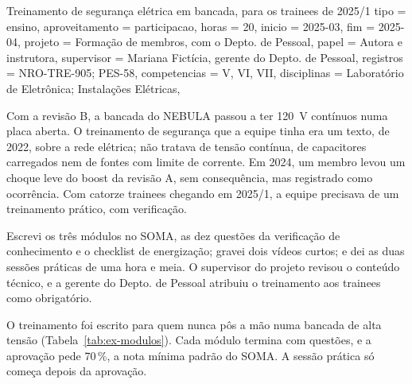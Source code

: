 \begin{atividade}{Treinamento de segurança elétrica em bancada, para os trainees de 2025/1}{
  tipo         = ensino,
  aproveitamento = participacao,
  horas        = 20,
  inicio       = 2025-03,
  fim          = 2025-04,
  projeto      = {Formação de membros, com o Depto. de Pessoal},
  papel        = {Autora e instrutora},
  supervisor   = {Mariana Fictícia, gerente do Depto. de Pessoal},
  registros    = {NRO-TRE-905; PES-58},
  competencias = {V, VI, VII},
  disciplinas  = {Laboratório de Eletrônica; Instalações Elétricas},
}

\begin{contexto}
Com a revisão B, a bancada do NEBULA passou a ter \SI{120}{\volt} contínuos numa placa aberta. O
treinamento de segurança que a equipe tinha era um texto, de 2022, sobre a rede elétrica; não tratava
de tensão contínua, de capacitores carregados nem de fontes com limite de corrente. Em 2024, um membro
levou um choque leve do boost da revisão A, sem consequência, mas registrado como ocorrência. Com
catorze trainees chegando em 2025/1, a equipe precisava de um treinamento prático, com verificação.
\end{contexto}

\begin{contribuicao}
Escrevi os três módulos no SOMA, as dez questões da verificação de conhecimento e o checklist de
energização; gravei dois vídeos curtos; e dei as duas sessões práticas de uma hora e meia. O supervisor
do projeto revisou o conteúdo técnico, e a gerente do Depto. de Pessoal atribuiu o treinamento aos
trainees como obrigatório.
\end{contribuicao}

\begin{desenvolvimento}

O treinamento foi escrito para quem nunca pôs a mão numa bancada de alta tensão
(Tabela~\ref{tab:ex-modulos}). Cada módulo termina com questões, e a aprovação pede 70\,\%, a nota
mínima padrão do SOMA. A sessão prática só começa depois da aprovação.


\end{desenvolvimento}
\end{atividade}
